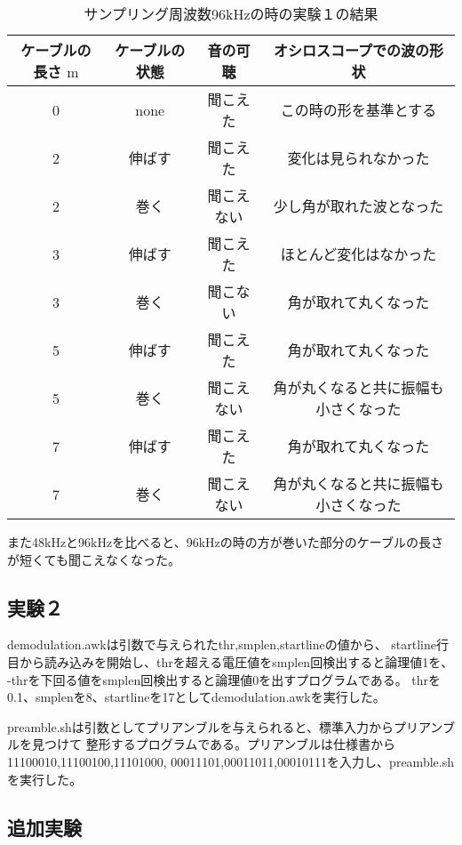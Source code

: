 \documentclass[11pt,a4j]{jsarticle}
\begin{document}
\begin{table}[H]
  \caption{サンプリング周波数96kHzの時の実験１の結果}
  \label{tab:j1result48}
  \begin{center}
      \begin{tabular}{cccc}
        \hline
				ケーブルの長さ $\mathrm{m}$	&	ケーブルの状態	&	音の可聴	&	オシロスコープでの波の形状	\\
				\hline  \hline
				0	&	none	&	聞こえた	&	この時の形を基準とする	\\
				2	&	伸ばす	&	聞こえた	&	変化は見られなかった	\\
				2	&	巻く	&	聞こえない	&	少し角が取れた波となった	\\
				3	&	伸ばす	&	聞こえた	&	ほとんど変化はなかった	\\
				3	&	巻く	&	聞こない	&	角が取れて丸くなった	\\
				5	&	伸ばす	&	聞こえた	&	角が取れて丸くなった	\\
				5	&	巻く	&	聞こえない	&	角が丸くなると共に振幅も小さくなった	\\
				7	&	伸ばす	&	聞こえた	&	角が取れて丸くなった	\\
				7	&	巻く	&	聞こえない	&	角が丸くなると共に振幅も小さくなった	\\ \hline
      \end{tabular}
  \end{center}
\end{table}

また48kHzと96kHzを比べると、96kHzの時の方が巻いた部分のケーブルの長さが短くても聞こえなくなった。


\subsection{実験２}
\label{sub:実験２結果}

demodulation.awkは引数で与えられたthr,smplen,startlineの値から、
startline行目から読み込みを開始し、thrを超える電圧値をsmplen回検出すると論理値1を、
-thrを下回る値をsmplen回検出すると論理値0を出すプログラムである。
thrを0.1、smplenを8、startlineを17としてdemodulation.awkを実行した。

preamble.shは引数としてプリアンブルを与えられると、標準入力からプリアンブルを見つけて
整形するプログラムである。プリアンブルは仕様書から11100010,11100100,11101000,
00011101,00011011,00010111を入力し、preamble.shを実行した。

\subsection{追加実験}
\label{sub:追加実験結果}
\end{document}
